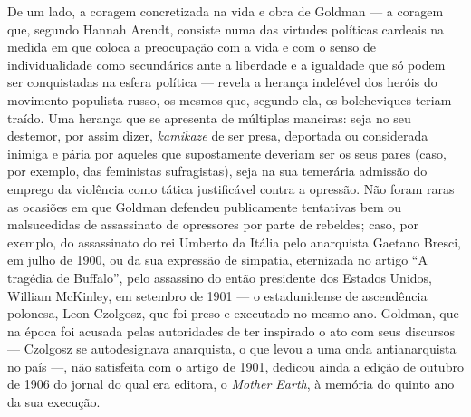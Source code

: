De um lado, a coragem concretizada na vida e obra de Goldman --- a
coragem que, segundo Hannah Arendt, consiste numa das virtudes políticas
cardeais na medida em que coloca a preocupação com a vida e com o senso
de individualidade como secundários ante a liberdade e a igualdade que
só podem ser conquistadas na esfera política --- revela a herança
indelével dos heróis do movimento populista russo, os mesmos que,
segundo ela, os bolcheviques teriam traído. Uma herança que se apresenta
de múltiplas maneiras: seja no seu destemor, por assim dizer,
\textit{kamikaze} de ser presa, deportada ou considerada inimiga e pária por
aqueles que supostamente deveriam ser os seus pares (caso, por exemplo,
das feministas sufragistas), seja na sua temerária admissão do emprego
da violência como tática justificável contra a opressão. Não foram raras
as ocasiões em que Goldman defendeu publicamente tentativas bem ou
malsucedidas de assassinato de opressores por parte de rebeldes; caso,
por exemplo, do assassinato do rei Umberto da Itália pelo anarquista
Gaetano Bresci, em julho de 1900, ou da sua expressão de simpatia,
eternizada no artigo ``A tragédia de Buffalo'', pelo assassino do então
presidente dos Estados Unidos, William McKinley, em setembro de 1901 ---
o estadunidense de ascendência polonesa, Leon Czolgosz, que foi preso e
executado no mesmo ano. Goldman, que na época foi acusada pelas
autoridades de ter inspirado o ato com seus discursos --- Czolgosz se
autodesignava anarquista, o que levou a uma onda antianarquista no país
---, não satisfeita com o artigo de 1901, dedicou ainda a edição de
outubro de 1906 do jornal do qual era editora, o \textit{Mother Earth}, à
memória do quinto ano da sua execução. 

